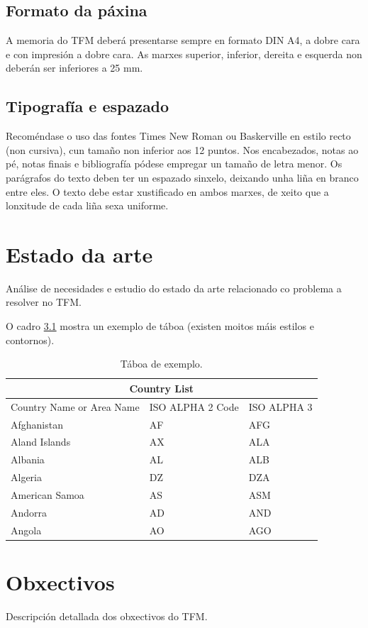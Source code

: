 \documentclass[%
    paper=A4,               %
    twoside,                %
    parskip=full,           %
    12pt,                   %
    titlepage=on,           %
    captions=tableabove,    %
]{book}                     %
\begin{document}
\section{Formato da páxina}
A memoria do TFM deberá presentarse sempre en formato DIN A4, a dobre
cara e con impresión a dobre cara. As marxes superior, inferior,
dereita e esquerda non deberán ser inferiores a 25 mm.

\section{Tipografía e espazado}
Recoméndase o uso das fontes Times New Roman ou Baskerville en estilo
recto (non cursiva), cun tamaño non inferior aos 12 puntos. Nos
encabezados, notas ao pé, notas finais e bibliografía pódese empregar
un tamaño de letra menor. Os parágrafos do texto deben ter un espazado
sinxelo, deixando unha liña en branco entre eles. O texto debe estar
xustificado en ambos marxes, de xeito que a lonxitude de cada liña
sexa uniforme.

\chapter{Estado da arte}
Análise de necesidades e estudio do estado da arte relacionado co
problema a resolver no TFM.

O cadro \ref{table:exemplo} mostra un exemplo de táboa (existen moitos
máis estilos e contornos).

\begin{table}[ht!]
\caption{Táboa de exemplo.}
\label{table:exemplo}
\centering
\begin{tabular}{ |p{6cm}|p{4cm}|p{4cm}|  }
\hline
\multicolumn{3}{|c|}{Country List} \\
\hline
Country Name or Area Name & ISO ALPHA 2 Code & ISO ALPHA 3 \\
\hline
Afghanistan & AF & AFG \\
Aland Islands & AX & ALA \\
Albania & AL & ALB \\
Algeria & DZ & DZA \\
American Samoa & AS & ASM \\
Andorra & AD & AND \\
Angola & AO & AGO \\
\hline
\end{tabular}
\end{table}

\chapter{Obxectivos}
Descripción detallada dos obxectivos do TFM.
\end{document}
